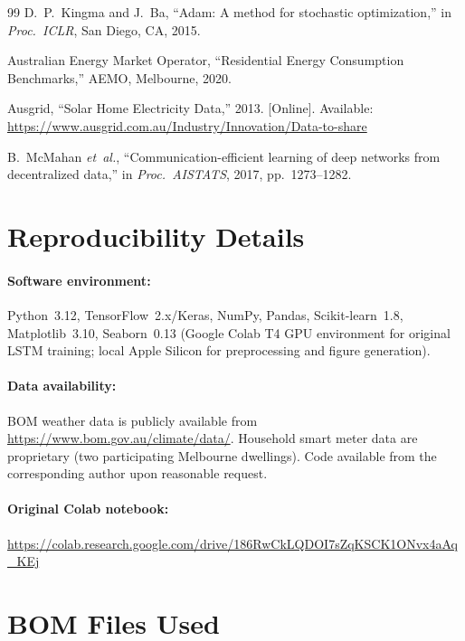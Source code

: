 \documentclass[12pt,a4paper]{article}
\begin{document}
\begin{thebibliography}{99}
D.~P.~Kingma and J.~Ba, ``Adam: A method for stochastic optimization,'' in
\emph{Proc.~ICLR}, San Diego, CA, 2015.

Australian Energy Market Operator, ``Residential Energy Consumption
Benchmarks,'' AEMO, Melbourne, 2020.

Ausgrid, ``Solar Home Electricity Data,'' 2013. [Online]. Available:
\url{https://www.ausgrid.com.au/Industry/Innovation/Data-to-share}

B.~McMahan \emph{et~al.}, ``Communication-efficient learning of deep networks
from decentralized data,'' in \emph{Proc.~AISTATS}, 2017, pp.~1273--1282.

\end{thebibliography}

\appendix

\section{Reproducibility Details}
\label{app:repro}

\paragraph{Software environment:}
Python~3.12, TensorFlow~2.x/Keras, NumPy, Pandas, Scikit-learn~1.8,
Matplotlib~3.10, Seaborn~0.13 (Google Colab T4 GPU environment for original
LSTM training; local Apple Silicon for preprocessing and figure generation).

\paragraph{Data availability:}
BOM weather data is publicly available from
\url{https://www.bom.gov.au/climate/data/}. Household smart meter data are
proprietary (two participating Melbourne dwellings). Code available from the
corresponding author upon reasonable request.

\paragraph{Original Colab notebook:}
\url{https://colab.research.google.com/drive/186RwCkLQDOI7sZqKSCK1ONvx4aAq_KEj}

\section{BOM Files Used}
\label{app:bom}
\end{document}
